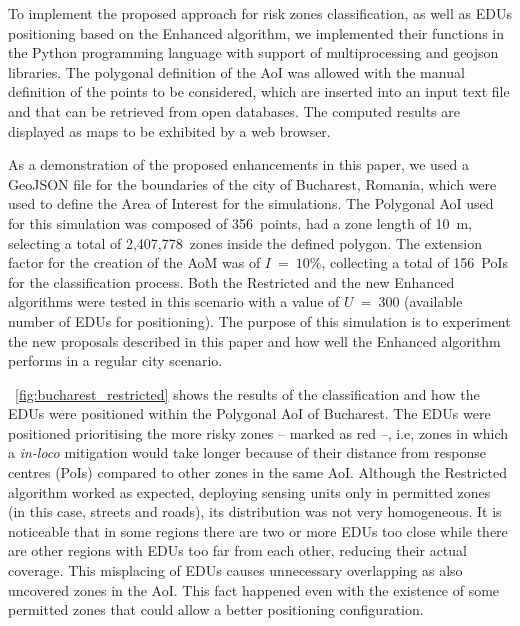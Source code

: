 \begin{refsection}
To implement the proposed approach for risk zones classification, as well as EDUs positioning based on the Enhanced algorithm, we implemented their functions in the Python programming language with support of multiprocessing and geojson libraries. The polygonal definition of the AoI was allowed with the manual definition of the points to be considered, which are inserted into an input text file and that can be retrieved from open databases. The computed results are displayed as maps to be exhibited by a web browser.

As a demonstration of the proposed enhancements in this paper, we used a GeoJSON file for the boundaries of the city of Bucharest, Romania, which were used to define the Area of Interest for the simulations. The Polygonal AoI used for this simulation was composed of 356~points, had a zone length of 10~m, selecting a total of 2,407,778~zones inside the defined polygon. The extension factor for the creation of the AoM was of $I~=~10\%$, collecting a total of 156~PoIs for the classification process. Both the Restricted and the new Enhanced algorithms were tested in this scenario with a value of $U~=~300$ (available number of EDUs for positioning). The purpose of this simulation is to experiment the new proposals described in this paper and how well the Enhanced algorithm performs in a regular city scenario.

\figurename~\ref{fig:bucharest_restricted} shows the results of the classification and how the EDUs were positioned within the Polygonal AoI of Bucharest. The EDUs were positioned prioritising the more risky zones -- marked as red --, i.e, zones in which a \emph{in-loco} mitigation would take longer because of their distance from response centres (PoIs) compared to other zones in the same AoI. Although the Restricted algorithm worked as expected, deploying sensing units only in permitted zones (in this case, streets and roads), its distribution was not very homogeneous. It is noticeable that in some regions there are two or more EDUs too close while there are other regions with EDUs too far from each other, reducing their actual coverage. This misplacing of EDUs causes unnecessary overlapping as also uncovered zones in the AoI. This fact happened even with the existence of some permitted zones that could allow a better positioning configuration.


\end{refsection}
